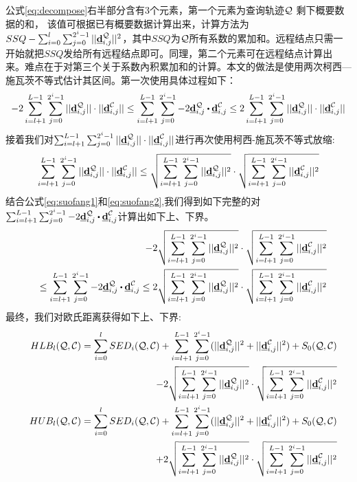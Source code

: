 公式\ref{eq:decompose}右半部分含有3个元素，第一个元素为查询轨迹$\cal Q$ 剩下概要数据的和， 该值可根据已有概要数据计算出来，计算方法为$SSQ-\sum_{i=0}^{l}\sum_{j=0}^{2^i-1}||\emph{{\textbf{d}}}_{i,j}^{\cal Q}||^2$，其中$SSQ$为$\cal Q$所有系数的累加和。远程结点只需一开始就把$SSQ$发给所有远程结点即可。同理，第二个元素可在远程结点计算出来。难点在于对第三个关于系数內积累加和的计算。本文的做法是使用两次柯西—施瓦茨不等式估计其区间。第一次使用具体过程如下：
\begin{eqnarray}\label{eq:suofang1}
	-2\sum_{i=l+1}^{L-1}\sum_{j=0}^{2^i-1} ||\vd_{i,j}^{\cal Q}||\cdot ||\vd_{i,j}^{\cal C}||
	\le  \sum_{i=l+1}^{L-1}\sum_{j=0}^{2^i-1} -2\vd_{i,j}^{\cal Q}\bigcdot \vd_{i,j}^{\cal C} 
	\le  2\sum_{i=l+1}^{L-1}\sum_{j=0}^{2^i-1} ||\vd_{i,j}^{\cal Q}||\cdot ||\vd_{i,j}^{\cal C}||
\end{eqnarray}
接着我们对$\sum_{i=l+1}^{L-1}\sum_{j=0}^{2^i-1} ||\emph{{\textbf{d}}}_{i,j}^{\cal Q}||\cdot ||\emph{{\textbf{d}}}_{i,j}^{\cal C}||$进行再次使用柯西-施瓦茨不等式放缩:
\begin{eqnarray}\label{eq:suofang2}
\sum_{i=l+1}^{L-1}\sum_{j=0}^{2^i-1} ||\emph{{\textbf{d}}}_{i,j}^{\cal Q}||\cdot ||\emph{{\textbf{d}}}_{i,j}^{\cal C}|| \le 
	\sqrt{\sum_{i=l+1}^{L-1}\sum_{j=0}^{2^i-1}||\emph{{\textbf{d}}}_{i,j}^{\cal Q}||^2} \cdot \sqrt{\sum_{i=l+1}^{L-1}\sum_{j=0}^{2^i-1}||\emph{{\textbf{d}}}_{i,j}^{\cal C}||^2}
\end{eqnarray}
结合公式\ref{eq:suofang1}和\ref{eq:suofang2},我们得到如下完整的对$\sum_{i=l+1}^{L-1}\sum_{j=0}^{2^i-1} -2\vd_{i,j}^{\cal Q}\bigcdot \vd_{i,j}^{\cal C} $计算出如下上、下界。
 \begin{eqnarray}\label{eq:bound}
&&-2\sqrt{\sum_{i=l+1}^{L-1}\sum_{j=0}^{2^i-1}||\vd_{i,j}^{\cal Q}||^2} \cdot \sqrt{\sum_{i=l+1}^{L-1}\sum_{j=0}^{2^i-1}||\vd_{i,j}^{\cal C}||^2} \nonumber \\
&& 
\le  \sum_{i=l+1}^{L-1}\sum_{j=0}^{2^i-1} -2\vd_{i,j}^{\cal Q}\bigcdot \vd_{i,j}^{\cal C} 
\le  2\sqrt{\sum_{i=l+1}^{L-1}\sum_{j=0}^{2^i-1}||\vd_{i,j}^{\cal Q}||^2} \cdot \sqrt{\sum_{i=l+1}^{L-1}\sum_{j=0}^{2^i-1}||\vd_{i,j}^{\cal C}||^2}
\end{eqnarray}
最终，我们对欧氏距离获得如下上、下界:
\allowdisplaybreaks
\begin{align} \label{eq:HaarBound}
&&	HLB_{l}({\cal Q},{\cal C}) =\sum_{i=0}^{l}SED_{i}({\cal Q},{\cal C})+
\sum_{i=l+1}^{L-1}\sum_{j=0}^{2^i-1}(||\emph{{\textbf{d}}}_{i,j}^{\cal Q}||^2+||\emph{{\textbf{d}}}_{i,j}^{\cal C}||^2)+ S_{0}({\cal Q},{\cal C}) \\
&&  - 2\sqrt{\sum_{i=l+1}^{L-1}\sum_{j=0}^{2^i-1}||\emph{{\textbf{d}}}_{i,j}^{\cal Q}||^2} \cdot \sqrt{\sum_{i=l+1}^{L-1}\sum_{j=0}^{2^i-1}||\emph{{\textbf{d}}}_{i,j}^{\cal C}||^2} \nonumber \\
&&	HUB_{l}({\cal Q},{\cal C}) = \sum_{i=0}^{l}SED_{i}({\cal Q},{\cal C})+
\sum_{i=l+1}^{L-1}\sum_{j=0}^{2^i-1}(||\emph{{\textbf{d}}}_{i,j}^{\cal Q}||^2+||\emph{{\textbf{d}}}_{i,j}^{\cal C}||^2)+S_{0}({\cal Q},{\cal C}) 
\nonumber \\
&&\qquad \quad + 2\sqrt{\sum_{i=l+1}^{L-1}\sum_{j=0}^{2^i-1}||\emph{{\textbf{d}}}_{i,j}^{\cal Q}||^2} \cdot \sqrt{\sum_{i=l+1}^{L-1}\sum_{j=0}^{2^i-1}||\emph{{\textbf{d}}}_{i,j}^{\cal C}||^2}
\end{align}
